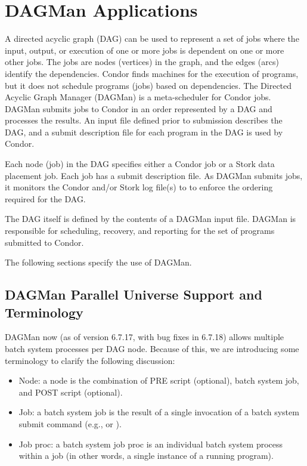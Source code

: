 \section{\label{sec:DAGMan}DAGMan Applications}

A directed acyclic graph (DAG) can be used to represent a set of jobs
where the input, output, or execution of one or more jobs
is dependent on one or more other jobs.
The jobs are nodes (vertices) in the graph,
and the edges (arcs) identify the dependencies.
Condor finds machines for the execution of programs, but it
does not schedule programs (jobs) based on dependencies.
The Directed Acyclic Graph Manager (DAGMan) is a meta-scheduler for Condor
jobs. 
DAGMan submits jobs to Condor in an order represented by
a DAG and processes the results.
An input file defined prior to submission describes the DAG, and
a submit description file for each program in the DAG
is used by Condor.

Each node (job) in the DAG specifies
either a Condor job or a Stork data placement job.
Each job has a submit description file.
As DAGMan submits jobs, it monitors the Condor and/or Stork log file(s) to 
to enforce the ordering required for the DAG.

The DAG itself is defined by the contents of a DAGMan input file.
DAGMan is responsible for scheduling, recovery, and reporting
for the set of programs submitted to Condor.

The following sections specify the use of DAGMan.

\subsection{\label{sec:DAGParallel}DAGMan Parallel Universe Support
and Terminology}

DAGMan now (as of version 6.7.17, with bug fixes in 6.7.18) allows
multiple batch system processes per DAG node.  Because of this, we
are introducing some terminology to clarify the following discussion:

\begin{itemize}
\item Node: a node is the combination of PRE script (optional), batch
system job, and POST script (optional).
\item Job: a batch system job is the result of a single invocation of
a batch system submit command (e.g.,  or ).
\item Job proc: a batch system job proc is an individual batch system
process within a job (in other words, a single instance of a running
program).
\end{itemize}

